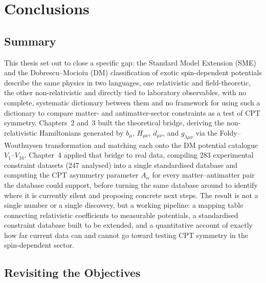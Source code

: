 \chapter{Conclusions}
\label{ch:conclusions}

\section{Summary}

This thesis set out to close a specific gap: the Standard Model Extension
(SME) and the Dobrescu--Mocioiu (DM) classification of exotic
spin-dependent potentials describe the same physics in two languages, one
relativistic and field-theoretic, the other non-relativistic and directly
tied to laboratory observables, with no complete, systematic dictionary
between them and no framework for using such a dictionary to compare
matter- and antimatter-sector constraints as a test of CPT symmetry.
Chapters~2 and~3 built the theoretical bridge, deriving the
non-relativistic Hamiltonians generated by $b_\mu$, $H_{\mu\nu}$,
$d_{\mu\nu}$, and $g_{\lambda\mu\nu}$ via the Foldy--Wouthuysen transformation and matching each
onto the DM potential catalogue $V_1$--$V_{16}$. Chapter~4 applied that
bridge to real data, compiling 283 experimental constraint datasets (247 analysed) into a
single standardised database and computing the CPT asymmetry parameter
$A_\alpha$ for every matter--antimatter pair the database could support,
before turning the same database around to identify where it is currently
silent and proposing concrete next steps. The result is not a single
number or a single discovery, but a working pipeline: a mapping table
connecting relativistic coefficients to measurable potentials, a
standardised constraint database built to be extended, and a quantitative
account of exactly how far current data can and cannot go toward testing
CPT symmetry in the spin-dependent sector.

\section{Revisiting the Objectives}

